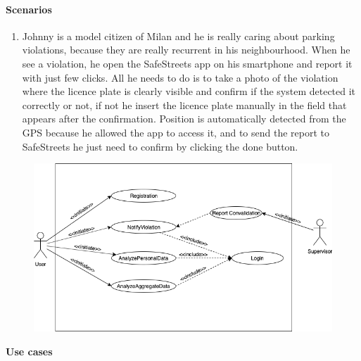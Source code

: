 \paragraph{Scenarios}
    \begin{enumerate}
        \item Johnny is a model citizen of Milan and he is really caring about parking violations, because they are really recurrent in his neighbourhood. When he see a violation, he open the SafeStreets app on his smartphone and report it with just few clicks. All he needs to do is to take a photo of the violation where the licence plate is clearly visible and confirm if the system detected it correctly or not, if not he insert the licence plate manually in the field that appears after the confirmation. Position is automatically detected from the GPS because he allowed the app to access it, and to send the report to SafeStreets he just need to confirm by clicking the done button.
    \end{enumerate}

\begin{figure}[htbp]
	\centering
    \includegraphics[width=\textwidth]{Images/UseCaseUser}
\end{figure}	
\textbf{Use cases}\\
\vskip 0.2in

